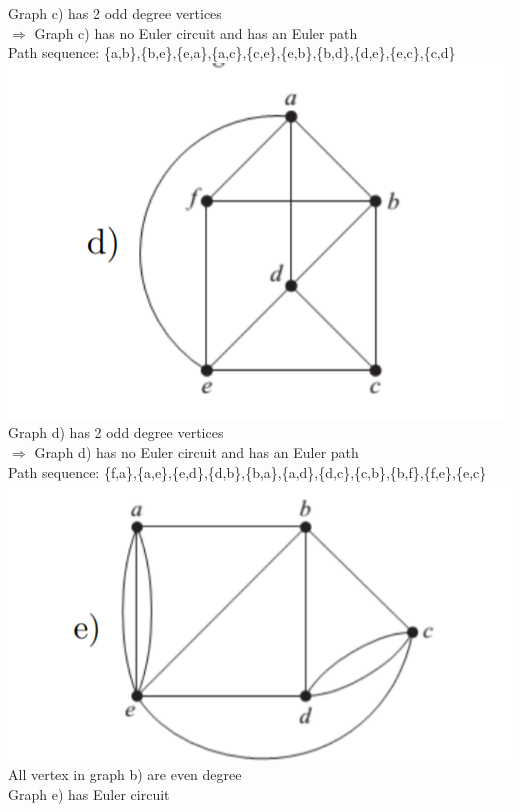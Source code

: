 \documentclass{article}
\begin{document}
\newline
Graph c) has 2 odd degree vertices\\
$\Rightarrow$ Graph c) has no Euler circuit and has an Euler path\\
Path sequence: \{a,b\},\{b,e\},\{e,a\},\{a,c\},\{c,e\},\{e,b\},\{b,d\},\{d,e\},\{e,c\},\{c,d\}
\newline
\includegraphics[]{Question 12/connectivity_12.d.png}
\newline
Graph d) has 2 odd degree vertices\\
$\Rightarrow$ Graph d) has no Euler circuit and has an Euler path\\
Path sequence: \{f,a\},\{a,e\},\{e,d\},\{d,b\},\{b,a\},\{a,d\},\{d,c\},\{c,b\},\{b,f\},\{f,e\},\{e,c\}
\newline
\includegraphics[]{Question 12/connectivity_12.e.png}
\newline
All vertex in graph b) are even degree\\
Graph e) has Euler circuit\\
\end{document}
